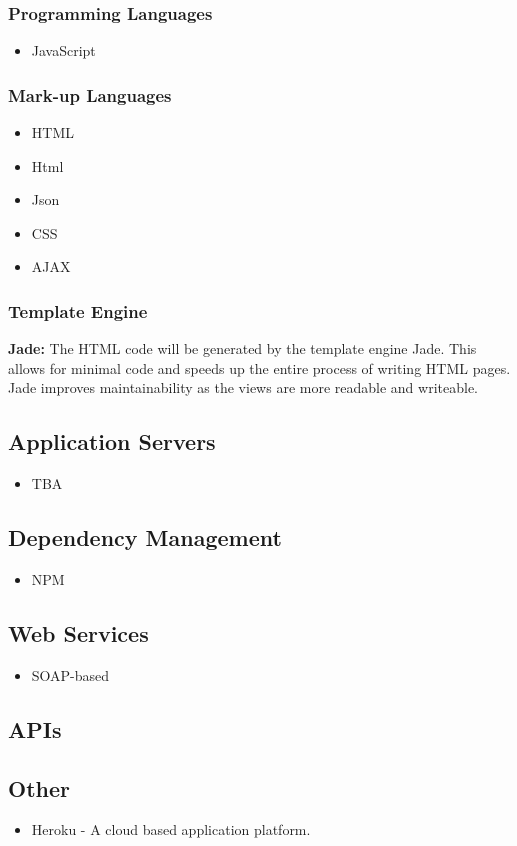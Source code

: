 \subsubsection{Programming Languages}
\begin{itemize}
	\item JavaScript	
\end{itemize}

\subsubsection{Mark-up Languages}
\begin{itemize}
	\item HTML
	\item Html
	\item Json
	\item CSS
	\item AJAX
\end{itemize}

\subsubsection{Template Engine}
\textbf{Jade:} The HTML code will be generated by the template engine Jade. This allows for minimal code and speeds up the entire process of writing HTML pages. Jade improves maintainability as the views are more readable and writeable.


\subsection{Application Servers}
\begin{itemize}
	\item TBA
\end{itemize}

\subsection{Dependency Management}
\begin{itemize}
	\item NPM
\end{itemize}

\subsection{Web Services}
\begin{itemize}
	\item SOAP-based
\end{itemize} 

\subsection{APIs}
\subsection{Other}
\begin{itemize}
	\item Heroku - A cloud based application platform.
\end{itemize}





